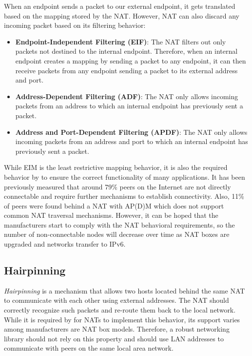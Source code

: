 When an endpoint sends a packet to our external endpoint, it gets translated based on the mapping stored by the NAT. However, NAT can also discard any incoming packet based on its filtering behavior:

\begin{itemize}
    \item \textbf{Endpoint-Independent Filtering (EIF)}: The NAT filters out only packets not destined to the internal endpoint. Therefore, when an internal endpoint creates a mapping by sending a packet to any endpoint, it can then receive packets from any endpoint sending a packet to its external address and port.
    \item \textbf{Address-Dependent Filtering (ADF)}: The NAT only allows incoming packets from an address to which an internal endpoint has previously sent a packet.
    \item \textbf{Address and Port-Dependent Filtering (APDF)}: The NAT only allows incoming packets from an address and port to which an internal endpoint has previously sent a packet.
\end{itemize}

While EIM is the least restrictive mapping behavior, it is also the required behavior by \cite{behave} to ensure the correct functionality of many applications. It has been previously measured that around 79\% peers on the Internet are not directly connectable and require further mechanisms to establish connectivity. Also, 11\% of peers were found behind a NAT with AP(D)M which does not support common NAT traversal mechanisms. \cite{nat_wild} However, it can be hoped that the manufacturers start to comply with the NAT behavioral requirements, so the number of non-connectable nodes will decrease over time as NAT boxes are upgraded and networks transfer to IPv6.


\subsection{Hairpinning}

\textit{Hairpinning} is a  mechanism that allows two hosts located behind the same NAT to communicate with each other using external addresses. The NAT should correctly recognize such packets and re-route them back to the local network. While it is required by \cite{behave} for NATs to implement this behavior, its support varies among manufacturers are NAT box models. Therefore, a robust networking library should not rely on this property and should use LAN addresses to communicate with peers on the same local area network.

